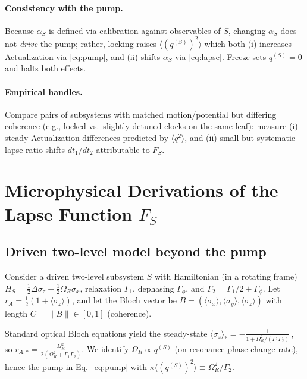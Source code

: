 \documentclass[11pt]{article}
\begin{document}
\paragraph{Consistency with the pump.} Because $\alpha_S$ is defined via calibration against observables of $S$, changing $\alpha_S$ does not \emph{drive} the pump; rather, locking raises $\langle (q^{(S)})^2\rangle$ which both (i) increases Actualization via \eqref{eq:pump}, and (ii) shifts $\alpha_S$ via \eqref{eq:lapse}. Freeze sets $q^{(S)}=0$ and halts both effects.

\paragraph{Empirical handles.} Compare pairs of subsystems with matched motion/potential but differing coherence (e.g., locked vs.\ slightly detuned clocks on the same leaf): measure (i) steady Actualization differences predicted by $\langle q^2\rangle$, and (ii) small but systematic lapse ratio shifts $dt_1/dt_2$ attributable to $F_S$.

\section{Microphysical Derivations of the Lapse Function \(F_S\)}
\label{sec:lapse_derivation}

\subsection{Driven two-level model beyond the pump}
Consider a driven two-level subsystem \(S\) with Hamiltonian (in a rotating frame) 
\(
H_S=\tfrac12\Delta\sigma_z+\tfrac12\Omega_R \sigma_x
\), 
relaxation \(\Gamma_1\), dephasing \(\Gamma_\phi\), and \(\Gamma_2=\Gamma_1/2+\Gamma_\phi\).
Let \(r_A=\tfrac12(1+\langle\sigma_z\rangle)\), and let the Bloch vector be \(B=(\langle\sigma_x\rangle,\langle\sigma_y\rangle,\langle\sigma_z\rangle)\) with length \(C=\|B\|\in[0,1]\) (coherence).

Standard optical Bloch equations yield the steady-state 
\(
\langle\sigma_z\rangle_{\!*}=-\frac{1}{1+\Omega_R^2/(\Gamma_1\Gamma_2)}\,,
\) 
so \(r_{A,*}=\frac{\Omega_R^2}{2(\Omega_R^2+\Gamma_1\Gamma_2)}\).
We identify \(\Omega_R\propto q^{(S)}\) (on-resonance phase-change rate), hence the pump in Eq.~\eqref{eq:pump} with 
\(\kappa \langle (q^{(S)})^2\rangle \equiv \Omega_R^2/\Gamma_2\).
\end{document}
